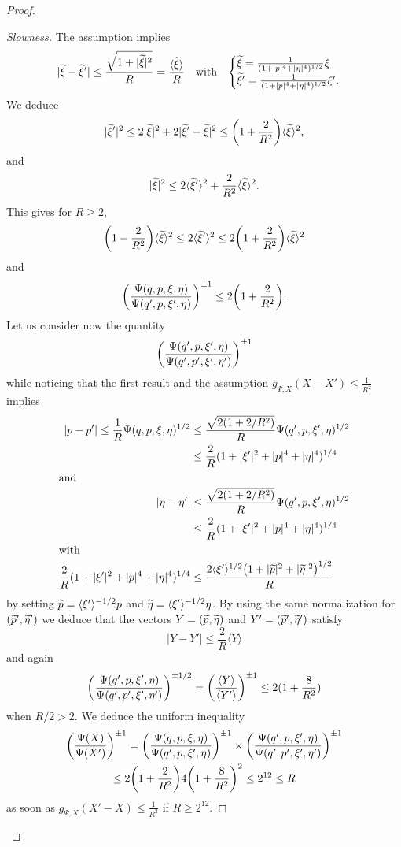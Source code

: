 \documentclass[AHL,Unicode,longabstracts]{cedram}
\let\oldtilde\tilde
\renewcommand*{\tilde}[1]{\mathchoice{\widetilde{#1}}{\widetilde{#1}}{\oldtilde{#1}}{\oldtilde{#1}}}
\let\originalleft\left
\let\originalright\right
\renewcommand{\left}{\mathopen{}\mathclose\bgroup\originalleft}
\renewcommand{\right}{\aftergroup\egroup\originalright}
\begin{document}
\begin{proof}
\begin{proof}[{Slowness}]
The assumption implies
\[
|\tilde{\xi}-\tilde{\xi}'|\leq \frac{\sqrt{1+|\tilde{\xi}|^{2}}}{R}=\frac{\langle \tilde{\xi}\rangle}{R}\quad\text{with}\quad
\begin{cases}
\tilde{\xi}=\frac{1}{(1+|p|^{4}+|\eta|^{4})^{1/2}}\xi
\\
\tilde{\xi}'=\frac{1}{(1+|p|^{4}+|\eta|^{4})^{1/2}}\xi'.
\end{cases}
\]
We deduce
\[
|\tilde{\xi}'|^{2}\leq 2|\tilde{\xi}|^{2}+2|\tilde{\xi}'-\tilde{\xi}|^{2}\leq \left(1+\frac{2}{R^{2}}\right)\langle \tilde{\xi}\rangle^{2},
\]
and
\[
|\tilde{\xi}|^{2}\leq 2\langle \tilde{\xi}'\rangle^{2}+\frac{2}{R^{2}}\langle \tilde{\xi}\rangle^{2}.
\]
This gives for $R\geq 2$,
\[
\left(1-\frac{2}{R^{2}}\right)\langle \tilde{\xi}\rangle^{2}\leq 2\langle \tilde{\xi}'\rangle^{2}\leq 2\left(1+\frac{2}{R^{2}}\right)\langle \tilde{\xi}\rangle^{2}
\]
and
\[
\left(\frac{\Psi(q,p,\xi,\eta)}{\Psi(q',p,\xi',\eta)}\right)^{\pm 1}\leq 2\left(1+\frac{2}{R^{2}}\right).
\]
Let us consider now the quantity
\[
\left(\frac{\Psi(q',p,\xi',\eta)}{\Psi(q',p',\xi',\eta')}\right)^{\pm 1}
\]
while noticing that the first result and the assumption $g_{\Psi,X}(X-X')\leq \frac{1}{R^{2}}$ implies
\begin{align*}
|p-p'|\leq \frac{1}{R}\Psi(q,p,\xi,\eta)^{1/2}&\leq \frac{\sqrt{2(1+2/R^{2})}}{R}\Psi(q',p,\xi',\eta)^{1/2}\\
&\leq
\frac{2}{R}(1+|\xi'|^{2}+|p|^{4}+|\eta|^{4})^{1/4}\\
\intertext{and}
|\eta-\eta'|&\leq \frac{\sqrt{2(1+2/R^{2})}}{R}\Psi(q',p,\xi',\eta)^{1/2}\\
&\leq
\frac{2}{R}(1+|\xi'|^{2}+|p|^{4}+|\eta|^{4})^{1/4}
\\
\intertext{with}
\frac{2}{R}(1+|\xi'|^{2}+|p|^{4}+|\eta|^{4})^{1/4}&\leq \frac{2\langle \xi'\rangle^{1/2}\left(1+|\tilde{p}|^{2}+|\tilde{\eta}|^{2}\right)^{1/2}}{R}
\end{align*}
by setting $\tilde{p}=\langle \xi'\rangle^{-1/2}p$ and $\tilde{\eta}=\langle \xi'\rangle^{-1/2}\eta$. By using the same normalization for $(\tilde{p}',\tilde{\eta}')$ we deduce that the vectors $Y=(\tilde{p},\tilde{\eta})$ and $Y'=(\tilde{p}',\tilde{\eta}')$ satisfy
\[
|Y-Y'|\leq \frac{2}{R}\langle Y\rangle
\]
and again
\[
\left(\frac{\Psi(q',p,\xi',\eta)}{\Psi(q',p',\xi',\eta')}\right)^{\pm 1/2} =\left(\frac{\langle Y\rangle}{\langle Y'\rangle}\right)^{\pm 1}\leq 2(1+\frac{8}{R^{2}})
\]
when $R/2>2$.
We deduce the uniform inequality
\begin{multline*}
\left(\frac{\Psi(X)}{\Psi(X')}\right)^{\pm 1} =
\left(\frac{\Psi(q,p,\xi,\eta)}{\Psi(q',p,\xi',\eta)}\right)^{\pm 1}\times
\left(\frac{\Psi(q',p,\xi',\eta)}{\Psi(q',p',\xi',\eta')}\right)^{\pm 1}\\
\leq 2\left(1+\frac{2}{R^{2}}\right)4\left(1+\frac{8}{R^{2}}\right)^{2}\leq 2^{12}\leq R
\end{multline*}
as soon as $g_{\Psi,X}(X'-X)\leq \frac{1}{R^{2}}$ if $R\geq 2^{12}$.
\let\qed\relax
\end{proof}


\end{proof}
\end{document}
